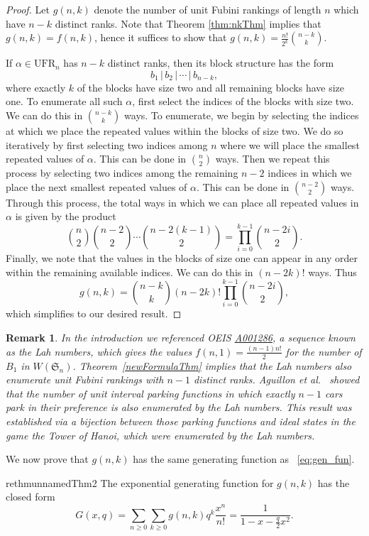 \documentclass[11pt,reqno]{amsart}
\newtheorem{remark}{Remark}[section]
\theoremstyle{definition}
\theoremstyle{notation}
\theoremstyle{openproblem}
\newcommand{\Sym}{\mathfrak{S}}
\newcommand{\UFR}[1]{\text{UFR}_{#1}}
\begin{document}
\begin{proof}
Let $g(n,k)$ denote the number of unit Fubini rankings of length $n$ which have $n-k$ distinct ranks. 
Note that Theorem \ref{thm:nkThm} implies that $g(n,k)=f(n,k)$, hence it suffices to show that $g(n,k)=\frac{n!}{2^k}\binom{n-k}{k}$.

If $\alpha\in\UFR{n}$ has $n-k$ distinct ranks, then its block structure has the form
\[b_1\,|\,b_2\,|\,\cdots\,|\,b_{n-k},\]
where exactly $k$ of the blocks have size two and all remaining blocks have size one. 
To enumerate all such $\alpha$, first select the indices of the blocks with size two. 
We can do this in $\binom{n-k}{k}$ ways. 
To enumerate, we begin by selecting the indices at which we place the repeated values within the blocks of size two. We do so iteratively by first selecting two indices among $n$ where we will place the smallest repeated values of $\alpha$. 
This can be done in $\binom{n}{2}$ ways.
Then we repeat this process by selecting two indices among the remaining $n-2$ indices in which we place the next smallest repeated values of $\alpha$. 
This can be done in $\binom{n-2}{2}$ ways.
Through this process, the total ways in which we can place all repeated values in $\alpha$ is given by the product 
\[\binom{n}{2}\binom{n-2}{2}\cdots \binom{n-2(k-1)}{2}=\prod_{i=0}^{k-1}\binom{n-2i}{2}.\]
Finally, we note that the values in the blocks of size one can appear in any order within the remaining available indices. 
We can do this in $(n-2k)!$ ways. Thus
\[
g(n,k)= \binom{n-k}{k}  (n-2k)! \prod_{i=0}^{k-1}\binom{n-2i}{2},
\]
    which simplifies to our desired result.
\end{proof}

\begin{remark}
In the introduction we referenced OEIS \href{https://oeis.org/A001286}{A001286}, a sequence known as the Lah numbers, which gives the values $f(n,1)=\frac{(n-1)n!}{2}$ for the number of $B_1$ in $W(\Sym_n)$. Theorem~\ref{newFormulaThm} implies that the Lah numbers also enumerate unit Fubini rankings with $n-1$ distinct ranks. 
Aguillon et al.~\cite{Hanoi} showed that the number of unit interval parking functions in which exactly $n-1$ cars park in their preference is also enumerated by the Lah numbers. 
This result was established via a bijection between those parking functions and ideal states in the game the Tower of Hanoi, which were enumerated by the Lah numbers.
\end{remark}



We now prove that $g(n,k)$ has the same generating function as ~\eqref{eq:gen_fun}.
\begin{restatable}{rethm}{unnamedThm2}
    The exponential generating function for $g(n,k)$ has the closed form
    \[
    G(x,q) = \sum_{n\geq 0} \sum_{k\geq 0} g(n,k)q^k\frac{x^n}{n!} = \frac{1}{1-x-\frac{q}{2}x^2}.
    \]
\end{restatable}
\end{document}
